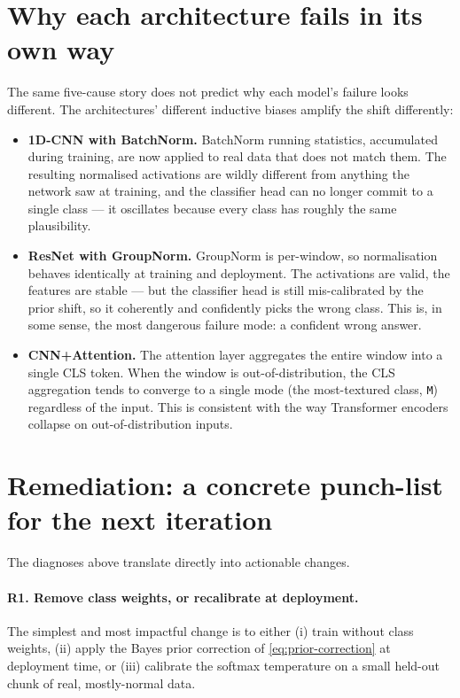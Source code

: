 \section{Why each architecture fails in its own way}
\label{sec:fail-archi}

The same five-cause story does not predict why each model's failure
looks different. The architectures' different inductive biases
amplify the shift differently:

\begin{itemize}[leftmargin=*, itemsep=0.2em]
    \item \textbf{1D-CNN with BatchNorm.} BatchNorm running
    statistics, accumulated during training, are now applied to real
    data that does not match them. The resulting normalised
    activations are wildly different from anything the network saw at
    training, and the classifier head can no longer commit to a single
    class --- it oscillates because every class has roughly the same
    plausibility.
    \item \textbf{ResNet with GroupNorm.} GroupNorm is per-window, so
    normalisation behaves identically at training and deployment. The
    activations are valid, the features are stable --- but the
    classifier head is still mis-calibrated by the prior shift, so it
    coherently and confidently picks the wrong class. This is, in some
    sense, the most dangerous failure mode: a confident wrong answer.
    \item \textbf{CNN+Attention.} The attention layer aggregates the
    entire window into a single CLS token. When the window is
    out-of-distribution, the CLS aggregation tends to converge to a
    single mode (the most-textured class, \texttt{M}) regardless of the
    input. This is consistent with the way Transformer encoders
    collapse on out-of-distribution inputs.
\end{itemize}

\section{Remediation: a concrete punch-list for the next iteration}
\label{sec:real-remediation}

The diagnoses above translate directly into actionable changes.

\paragraph{R1. Remove class weights, or recalibrate at deployment.}
The simplest and most impactful change is to either (i) train without
class weights, (ii) apply the Bayes prior correction of
\cref{eq:prior-correction} at deployment time, or (iii) calibrate the
softmax temperature on a small held-out chunk of real, mostly-normal
data.

